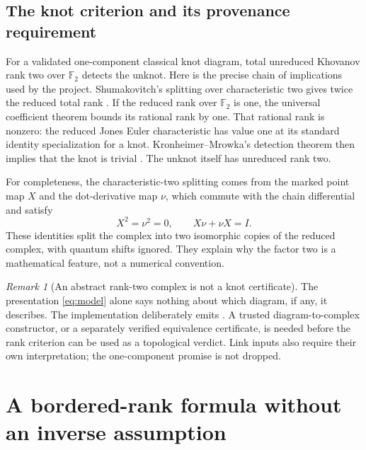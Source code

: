 \documentclass[11pt,letterpaper]{article}
\newcommand{\F}{{\mathbb F_2}}
\newcommand{\code}[1]{\texttt{\detokenize{#1}}}
\theoremstyle{definition}
\theoremstyle{remark}
\newtheorem{remark}[theorem]{Remark}
\numberwithin{equation}{section}
\begin{document}
\subsection{The knot criterion and its provenance requirement}
For a validated one-component classical knot diagram, total unreduced
Khovanov rank two over $\F$ detects the unknot. Here is the precise chain
of implications used by the project. Shumakovitch's splitting over
characteristic two gives twice the reduced total rank
\cite[Corollary 3.2.C]{shumakovitch}. If the reduced rank over $\F$ is one,
the universal coefficient theorem bounds its rational rank by one.
That rational rank is nonzero: the reduced Jones Euler characteristic
has value one at its standard identity specialization for a knot.
Kronheimer--Mrowka's detection theorem then implies that the knot is
trivial \cite{kronheimer}. The unknot itself has unreduced rank two.

For completeness, the characteristic-two splitting comes from the marked
point map $X$ and the dot-derivative map $\nu$, which commute with the chain
differential and satisfy
\[
 X^2=\nu^2=0,\qquad X\nu+\nu X=I.
\]
These identities split the complex into two isomorphic copies of the
reduced complex, with quantum shifts ignored. They explain why the factor
two is a mathematical feature, not a numerical convention.

\begin{remark}[An abstract rank-two complex is not a knot certificate]
The presentation \eqref{eq:model} alone says nothing about which diagram,
if any, it describes. The implementation deliberately emits
\code{topological_verdict: null}. A trusted diagram-to-complex constructor,
or a separately verified equivalence certificate, is needed before the
rank criterion can be used as a topological verdict. Link inputs also
require their own interpretation; the one-component promise is not dropped.
\end{remark}

\section{A bordered-rank formula without an inverse assumption}
\label{sec:border}
\end{document}
